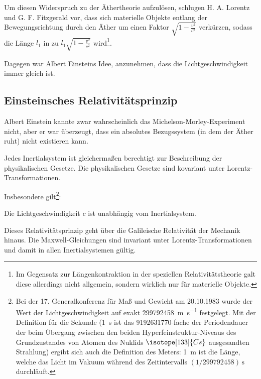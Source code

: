 Um diesen Widerspruch zu der Äthertheorie aufzulösen, schlugen H. A. Lorentz und G. F. Fitzgerald vor, dass sich materielle Objekte entlang der Bewegungsrichtung durch den Äther um einen Faktor $\sqrt{1-\frac{v^2}{c^2}}$ verkürzen,
sodass die Länge $l_1$ in  zu $l_1\sqrt{1-\frac{v^2}{c^2}}$ wird\footnote{Im Gegensatz zur Längenkontraktion in der speziellen Relativitätstheorie galt diese allerdings nicht allgemein, sondern wirklich nur für materielle Objekte.}.

Dagegen war Albert Einsteins Idee, anzunehmen, dass die Lichtgeschwindigkeit immer gleich ist.




\subsection{Einsteinsches Relativitätsprinzip}

Albert Einstein kannte zwar wahrscheinlich das Michelson-Morley-Experiment nicht, aber er war überzeugt, dass ein absolutes Bezugssystem (in dem der Äther ruht) nicht existieren kann.

\begin{formal}
    Jedes Inertialsystem ist gleichermaßen berechtigt zur Beschreibung der physikalischen Gesetze. Die physikalischen Gesetze sind kovariant unter Lorentz-Transformationen.
\end{formal}

Insbesondere gilt\footnote{Bei der 17. Generalkonferenz für Maß und Gewicht am 20.10.1983 wurde der Wert der Lichtgeschwindigkeit auf exakt \SI{299 792 458}{\m\per\s} festgelegt.
    Mit der Definition für die Sekunde (\SI{1}{\s} ist das 9192631770-fache der Periodendauer der beim Übergang zwischen den beiden Hyperfeinstruktur-Niveaus des Grundzustandes von Atomen des Nuklids $\isotope[133]{Cs}$ ausgesandten Strahlung) ergibt sich auch die Definition des Meters: \SI{1}{\m} ist die Länge, welche das Licht im Vakuum während des Zeitintervalls $(1/299792458)\,\si{\s}$ durchläuft.}:

\begin{formal}
    Die Lichtgeschwindigkeit $c$ ist unabhängig vom Inertialsystem.
\end{formal}

Dieses Relativitätsprinzip geht über die Galileische Relativität der Mechanik hinaus.
Die Maxwell-Gleichungen sind invariant unter Lorentz-Transformationen und damit in allen Inertialsystemen gültig.

